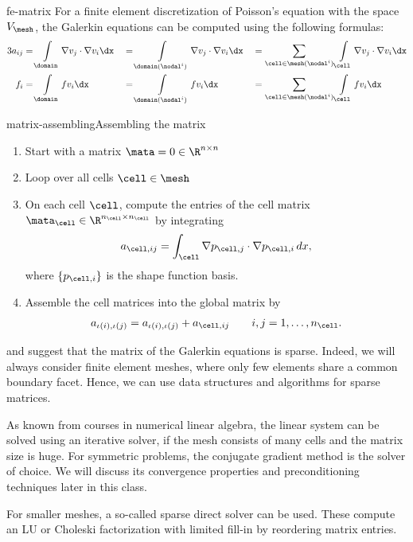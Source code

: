 \begin{Lemma}{fe-matrix}
  For a finite element discretization of Poisson's equation with the
  space $V_\mesh$, the Galerkin equations can be computed using the
  following formulas:
  \begin{alignat*}3
    a_{ij} &= \int\limits_\domain \nabla v_j \cdot \nabla v_i \dx
    &&= \int\limits_{\domain(\nodal^i)} \nabla v_j \cdot \nabla v_i \dx
    &&= \sum_{\cell\in\mesh(\nodal^i)}\int\limits_\cell \nabla v_j \cdot \nabla v_i \dx\\
    f_{i} &= \int\limits_\domain f v_i \dx
    &&= \int\limits_{\domain(\nodal^i)} f v_i \dx
    &&= \sum_{\cell\in\mesh(\nodal^i)}\int\limits_\cell f v_i \dx
  \end{alignat*}
\end{Lemma}

\begin{Algorithm*}{matrix-assembling}{Assembling the matrix}
  \begin{enumerate}
  \item Start with a matrix $\mata = 0 \in \R^{n\times n}$
  \item Loop over all cells $\cell\in\mesh$
  \item On each cell $\cell$, compute the entries of the cell matrix
    $\mata_\cell \in \R^{n_\cell\times n_\cell}$ by integrating
    \begin{gather}
      a_{\cell,ij} = \int_\cell \nabla p_{\cell,j}\cdot\nabla p_{\cell,i}\,dx,
    \end{gather}
    where $\{p_{\cell,i}\}$ is the shape function basis.
  \item Assemble the cell matrices into the global matrix by
    \begin{gather}
      a_{\iota(i),\iota(j)} = a_{\iota(i),\iota(j)} + a_{\cell,ij}
      \qquad i,j = 1,\dots,n_\cell.
    \end{gather}
  \end{enumerate}
\end{Algorithm*}

\begin{remark}
   and
   suggest that the matrix of
  the Galerkin equations is sparse. Indeed, we will always consider
  finite element meshes, where only few elements share a common
  boundary facet. Hence, we can use data structures and algorithms for
  sparse matrices.
\end{remark}

\begin{remark}
  As known from courses in numerical linear algebra, the linear system
  can be solved using an iterative solver, if the mesh consists of
  many cells and the matrix size is huge. For symmetric problems, the
  conjugate gradient method is the solver of choice. We will discuss
  its convergence properties and preconditioning techniques later in
  this class.

  For smaller meshes, a so-called sparse direct solver can be
  used. These compute an LU or Choleski factorization with limited
  fill-in by reordering matrix entries.
\end{remark}


